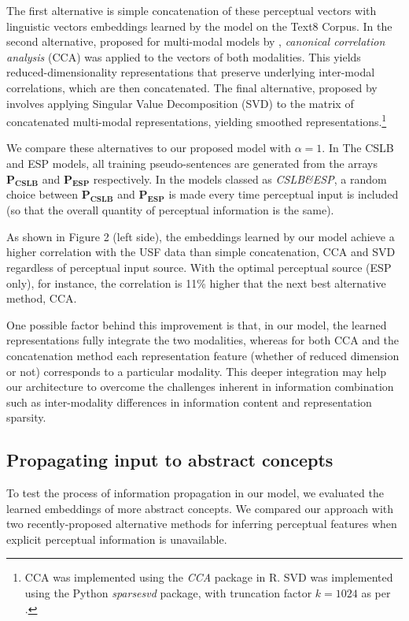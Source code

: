 \documentclass[11pt]{article}
\begin{document}
The first alternative is simple concatenation of these perceptual vectors with linguistic vectors embeddings learned by the  model on the Text8 Corpus. In the second alternative, proposed for multi-modal models by , \emph{canonical correlation analysis} (CCA) \cite{hardoon2004canonical} was applied to the vectors of both modalities. This yields reduced-dimensionality representations that preserve underlying inter-modal correlations, which are then concatenated. The final alternative, proposed by  involves applying Singular Value Decomposition (SVD) to the matrix of concatenated multi-modal representations, yielding smoothed representations.\footnote{CCA was implemented using the \emph{CCA} package in R. SVD was implemented using the Python \emph{sparsesvd} package, with truncation factor \(k=1024\) as per \cite{bruni2014multimodal}.}



We compare these alternatives to our proposed model with \(\alpha = 1\). In The CSLB and ESP models, all training pseudo-sentences are generated from the arrays \(\mathbf{P_{CSLB}}\) and \(\mathbf{P_{ESP}}\) respectively. In the models classed as \emph{CSLB\&ESP}, a random choice between \(\mathbf{P_{CSLB}}\) and \(\mathbf{P_{ESP}}\) is made every time perceptual input is included (so that the overall quantity of perceptual information is the same). 

As shown in Figure 2 (left side), the embeddings learned by our model achieve a higher correlation with the USF data than simple concatenation, CCA and SVD regardless of perceptual input source. With the optimal perceptual source (ESP only), for instance, the correlation is 11\% higher that the next best alternative method, CCA. 

One possible factor behind this improvement is that, in our model, the learned representations fully integrate the two modalities, whereas for both CCA and the concatenation method each representation feature (whether of reduced dimension or not) corresponds to a particular modality. This deeper integration may help our architecture to overcome the challenges inherent in information combination such as inter-modality differences in information content and representation sparsity.   


\subsection{Propagating input to abstract concepts}To test the process of information propagation in our model, we evaluated the learned embeddings of more abstract concepts. We compared our approach with two recently-proposed alternative methods for inferring perceptual features when explicit perceptual information is unavailable. 
\end{document}
